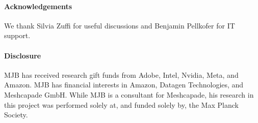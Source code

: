 \paragraph{Acknowledgements}
We thank Silvia Zuffi for useful discussions and Benjamin Pellkofer for IT support.

\paragraph{Disclosure}
MJB has received research gift funds from Adobe, Intel, Nvidia, Meta, and Amazon.
MJB has financial interests in Amazon, Datagen Technologies, and Meshcapade GmbH.
While MJB is a consultant for Meshcapade, his research in this project was performed solely at, and funded solely by, the Max Planck Society.